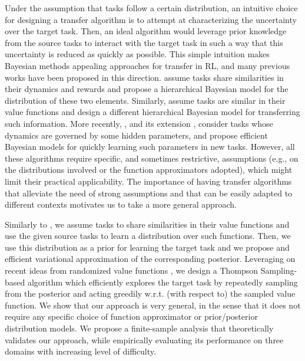 \documentclass{article}
\begin{document}
Under the assumption that tasks follow a certain distribution, an intuitive choice for designing a transfer algorithm is to attempt at characterizing the uncertainty over the target task. Then, an ideal algorithm would leverage prior knowledge from the source tasks to interact with the target task in such a way that this uncertainty is reduced as quickly as possible. This simple intuition makes Bayesian  methods appealing approaches for transfer in RL, and many previous works have been proposed in this direction. \cite{wilson2007multi} assume tasks share similarities in their dynamics and rewards and propose a hierarchical Bayesian model for the distribution of these two elements. Similarly, \cite{lazaric2010bayesian} assume tasks are similar in their value functions and design a different hierarchical Bayesian model for transferring such information. More recently, \cite{doshi2016hidden}, and its extension \cite{killian2017robust}, consider tasks whose dynamics are governed by some hidden parameters, and propose efficient Bayesian models for quickly learning such parameters in new tasks. However, all these algorithms require specific, and sometimes restrictive, assumptions (e.g., on the distributions involved or the function approximators adopted), which might limit their practical applicability. The importance of having transfer algorithms that alleviate the need of strong assumptions and that can be easily adapted to different contexts motivates us to take a more general approach.

Similarly to \cite{lazaric2010bayesian}, we assume tasks to share similarities in their value functions and use the given source tasks to learn a distribution over such functions. Then, we use this distribution as a prior for learning the target task and we propose and efficient variational approximation of the corresponding posterior. Leveraging on recent ideas from randomized value functions \cite{osband2014generalization}, we design a Thompson Sampling-based algorithm which efficiently explores the target task by repeatedly sampling from the posterior and acting greedily w.r.t. (with respect to) the sampled value function. We show that our approach is very general, in the sense that it does not require any specific choice of function approximator or prior/posterior distribution models. We propose a finite-sample analysis that theoretically validates our approach, while empirically evaluating its performance on three domains with increasing level of difficulty.
\end{document}
